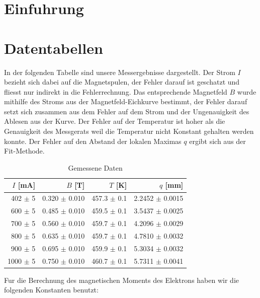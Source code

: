 \documentclass[a4paper,parskip,11pt, DIV12]{scrreprt}
\begin{document}
\fancyfoot{}
\fancyfoot[R]{\small \thepage}
\fancyfoot[L]{}
\fancyfoot[C]{}
\renewcommand{\footrulewidth}{0.4pt} 

\addtolength{\headheight}{2\baselineskip}
\addtolength{\headheight}{0.6pt}


\renewcommand{\headrulewidth}{0.6pt}
\renewcommand{\footrulewidth}{0.4pt}

\renewcommand{\chaptermark}[1]{ \markboth{#1}{} } %



\chapter{Einfuhrung}


\clearpage

\chapter{Datentabellen}

In der folgenden Tabelle sind unsere Messergebnisse dargestellt. Der Strom $I$ bezieht sich dabei auf die Magnetspulen, der Fehler darauf ist geschatzt und fliesst nur indirekt in die Fehlerrechnung. Das entsprechende Magnetfeld $B$ wurde mithilfe des Stroms aus der Magnetfeld-Eichkurve bestimmt, der Fehler darauf setzt sich zusammen aus dem Fehler auf dem Strom und der Ungenauigkeit des Ablesen aus der Kurve. Der Fehler auf der Temperatur ist hoher als die Genauigkeit des Messgerats weil die Temperatur nicht Konstant gehalten werden konnte. Der Fehler auf den Abstand der lokalen Maximas $q$ ergibt sich aus der Fit-Methode.
\begin{table}[H]
\centering
\renewcommand{\arraystretch}{1.2} %
\setlength{\tabcolsep}{3mm} %
\begin{tabular}{r|r|r|r}
$I$ [mA] & $B$ [T] & $T$ [K]  & $q$ [mm]\\ \hline
402   $\pm$ 5      & 0.320   $\pm$ 0.010   & 457.3  $\pm$ 0.1   & 2.2452 $\pm$ 0.0015 \\
600    $\pm$ 5      & 0.485   $\pm$ 0.010   & 459.5  $\pm$ 0.1   &3.5437  $\pm$ 0.0025\\
700    $\pm$ 5      & 0.560   $\pm$ 0.010  & 459.7   $\pm$ 0.1   &4.2096  $\pm$ 0.0029\\
800    $\pm$ 5     & 0.635    $\pm$ 0.010 & 459.7    $\pm$ 0.1   & 4.7810 $\pm$  0.0032 \\
900    $\pm$ 5     & 0.695    $\pm$ 0.010 & 459.9    $\pm$ 0.1    &5.3034  $\pm$  0.0032 \\
1000    $\pm$ 5    & 0.750     $\pm$ 0.010 & 460.7       $\pm$ 0.1 &5.7311  $\pm$ 0.0041
\end{tabular}
\caption[Daten]{Gemessene Daten}
\end{table} 
Fur die Berechnung des magnetischen Moments des Elektrons haben wir die folgenden Konstanten benutzt:\\
\end{document}
